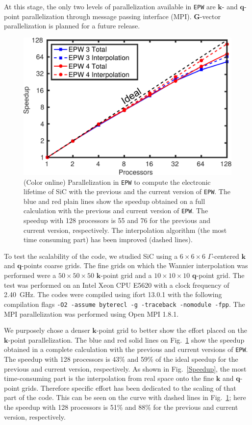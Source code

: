 \documentclass[final,3p,times,twocolumn]{elsarticle}
\begin{document}
At this stage, the only two levels of parallelization available in \texttt{EPW} are $\mathbf{k}$- and $\mathbf{q}$-point parallelization through message passing interface (MPI). $\mathbf{G}$-vector parallelization is planned for a future release.
\begin{figure}[b!]
  \centering
  \includegraphics[width=0.99\linewidth]{EPW_scalability3.pdf}
  \caption{\label{Scalability}(Color online) Parallelization in \texttt{EPW} to compute the electronic lifetime of SiC with the previous and the current version of \texttt{EPW}.  
The blue and red plain lines show the speedup obtained on a full calculation with the previous and current version of \texttt{EPW}. The speedup with 128 processors is 55 and 76 for the previous and current version, respectively.   
The interpolation algorithm (the most time consuming part) has been improved (dashed lines).}
\end{figure}

To test the scalability of the code, we studied SiC using a $6\times6\times6$ $\Gamma$-centered $\mathbf{k}$ and $\mathbf{q}$-points coarse grids. The fine grids on which the Wannier interpolation was performed were a $50\times50\times50$ $\mathbf{k}$-point grid and a $10\times10\times10$ $\mathbf{q}$-point grid.  The test was performed on an Intel Xeon CPU E5620 with a clock frequency of 2.40~GHz. The codes were compiled using ifort 13.0.1 with the following compilation flags \texttt{-O2 -assume byterecl -g -traceback -nomodule -fpp}. The MPI parallelization was performed using Open MPI 1.8.1.

We purposely chose a denser $\mathbf{k}$-point grid to better show the effort placed on the $\mathbf{k}$-point parallelization.
The blue and red solid lines on Fig.~\ref{Scalability} show the speedup obtained in a complete calculation with the previous and current versions of \texttt{EPW}. The speedup with 128 processors is 43\% and 59\% of the ideal speedup for the previous and current version, respectively. 
As shown in Fig.~\ref{Speedup}, the most time-consuming part is the interpolation from real space onto the fine  $\mathbf{k}$ and $\mathbf{q}$-point grids. Therefore specific effort has been dedicated to the scaling of that part of the code. This can be seen on the curve with dashed lines in Fig.~\ref{Scalability}; here the speedup with 128 processors is 51\% and 88\% for the previous and current version, respectively.
\end{document}
